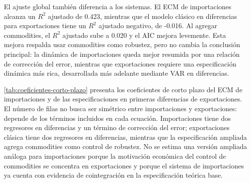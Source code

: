 \documentclass[11pt,a4paper]{article}
\begin{document}
	El ajuste global también diferencia a los sistemas. El ECM de importaciones
	alcanza un \(R^2\) ajustado de 0.423, mientras que el modelo clásico en
	diferencias para exportaciones tiene un \(R^2\) ajustado negativo, de -0.016. Al
	agregar commodities, el \(R^2\) ajustado sube a 0.020 y el AIC mejora
	levemente. Esta mejora respalda usar commodities como robustez, pero no cambia
	la conclusión principal: la dinámica de importaciones queda mejor resumida por
	una relación de corrección del error, mientras que exportaciones requiere una
	especificación dinámica más rica, desarrollada más adelante mediante VAR en
	diferencias.

	\autoref{tab:coeficientes-corto-plazo} presenta los coeficientes de corto plazo
	del ECM de importaciones y de las especificaciones en primeras diferencias de
	exportaciones. El número de filas no busca ser simétrico entre importaciones y
	exportaciones: depende de los términos incluidos en cada ecuación. Importaciones
	tiene dos regresores en diferencias y un término de corrección del error;
	exportaciones clásica tiene dos regresores en diferencias, mientras que la
	especificación ampliada agrega commodities como control de robustez. No se
	estima una versión ampliada análoga para importaciones porque la motivación
	económica del control de commodities se concentra en exportaciones y porque el
	sistema de importaciones ya cuenta con evidencia de cointegración en la
	especificación teórica base.
\end{document}
